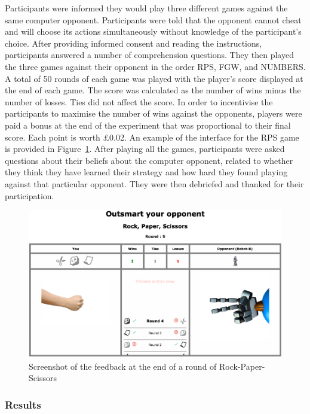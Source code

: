 \documentclass[man,floatsintext]{apa6}
\begin{document}
Participants were informed they would play three different games against the same computer opponent. Participants were told that the opponent cannot cheat and will choose its actions simultaneously without knowledge of the participant's choice. After providing informed consent and reading the instructions, participants answered a number of comprehension questions. They then played the three games against their opponent in the order RPS, FGW, and NUMBERS. A total of 50 rounds of each game was played with the player's score displayed at the end of each game. The score was calculated as the number of wins minus the number of losses. Ties did not affect the score. In order to incentivise the participants to maximise the number of wins against the opponents, players were paid a bonus at the end of the experiment that was proportional to their final score. Each point is worth £0.02. An example of the interface for the RPS game is provided in Figure~\ref{fig:feedback-rps-exp2}. After playing all the games, participants were asked questions about their beliefs about the computer opponent, related to whether they think they have learned their strategy and how hard they found playing against that particular opponent. They were then debriefed and thanked for their participation.

\begin{figure}

{\centering \includegraphics{images/feedback_rps} 

}

\caption{Screenshot of the feedback at the end of a round of Rock-Paper-Scissors}\label{fig:feedback-rps-exp2}
\end{figure}

\hypertarget{results}{%
\subsubsection{Results}\label{results}}
\end{document}
